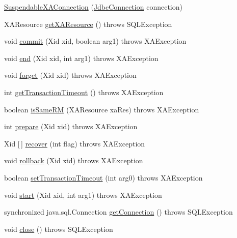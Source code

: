 \begin{DoxyCompactItemize}
\item 
\mbox{\hyperlink{classcom_1_1mysql_1_1cj_1_1jdbc_1_1_suspendable_x_a_connection_ac685fd6cf1d33191f66a837e07be273c}{Suspendable\+X\+A\+Connection}} (\mbox{\hyperlink{interfacecom_1_1mysql_1_1cj_1_1jdbc_1_1_jdbc_connection}{Jdbc\+Connection}} connection)
\item 
X\+A\+Resource \mbox{\hyperlink{classcom_1_1mysql_1_1cj_1_1jdbc_1_1_suspendable_x_a_connection_a46b973eb31a0e5df5d099ad677e81ab8}{get\+X\+A\+Resource}} ()  throws S\+Q\+L\+Exception 
\item 
void \mbox{\hyperlink{classcom_1_1mysql_1_1cj_1_1jdbc_1_1_suspendable_x_a_connection_a3a411547db0758969a131730f0f11f4f}{commit}} (Xid xid, boolean arg1)  throws X\+A\+Exception 
\item 
void \mbox{\hyperlink{classcom_1_1mysql_1_1cj_1_1jdbc_1_1_suspendable_x_a_connection_a1235ee5810bd34b54230b86cb43a9ecd}{end}} (Xid xid, int arg1)  throws X\+A\+Exception 
\item 
void \mbox{\hyperlink{classcom_1_1mysql_1_1cj_1_1jdbc_1_1_suspendable_x_a_connection_a586078a515789ca4c1868d063c4db65a}{forget}} (Xid xid)  throws X\+A\+Exception 
\item 
int \mbox{\hyperlink{classcom_1_1mysql_1_1cj_1_1jdbc_1_1_suspendable_x_a_connection_aaa0f3a39cd5176332c3fd5cf2a9c7ab6}{get\+Transaction\+Timeout}} ()  throws X\+A\+Exception 
\item 
boolean \mbox{\hyperlink{classcom_1_1mysql_1_1cj_1_1jdbc_1_1_suspendable_x_a_connection_ad24346eedc086b1ce39a677d2b4a00c5}{is\+Same\+RM}} (X\+A\+Resource xa\+Res)  throws X\+A\+Exception 
\item 
int \mbox{\hyperlink{classcom_1_1mysql_1_1cj_1_1jdbc_1_1_suspendable_x_a_connection_aeea86b3e132c2fb1baa8d181c593b5dd}{prepare}} (Xid xid)  throws X\+A\+Exception 
\item 
Xid \mbox{[}$\,$\mbox{]} \mbox{\hyperlink{classcom_1_1mysql_1_1cj_1_1jdbc_1_1_suspendable_x_a_connection_ac136b715627473b77b2668485a189dad}{recover}} (int flag)  throws X\+A\+Exception 
\item 
void \mbox{\hyperlink{classcom_1_1mysql_1_1cj_1_1jdbc_1_1_suspendable_x_a_connection_a9167b090a36d780e18fc699e0aa2cbcb}{rollback}} (Xid xid)  throws X\+A\+Exception 
\item 
boolean \mbox{\hyperlink{classcom_1_1mysql_1_1cj_1_1jdbc_1_1_suspendable_x_a_connection_a9e5215a340c576da77edd4f523bfb71e}{set\+Transaction\+Timeout}} (int arg0)  throws X\+A\+Exception 
\item 
void \mbox{\hyperlink{classcom_1_1mysql_1_1cj_1_1jdbc_1_1_suspendable_x_a_connection_a8d0fbd3c10412c014ba642b955435d8c}{start}} (Xid xid, int arg1)  throws X\+A\+Exception 
\item 
synchronized java.\+sql.\+Connection \mbox{\hyperlink{classcom_1_1mysql_1_1cj_1_1jdbc_1_1_suspendable_x_a_connection_a1a7f46f44b6433f57b5126ba6879f7d4}{get\+Connection}} ()  throws S\+Q\+L\+Exception 
\item 
void \mbox{\hyperlink{classcom_1_1mysql_1_1cj_1_1jdbc_1_1_suspendable_x_a_connection_ae22f87e04caefd066bf411f203a7ff5c}{close}} ()  throws S\+Q\+L\+Exception 
\end{DoxyCompactItemize}
